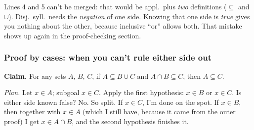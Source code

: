 \begin{center}
\end{center}

Lines 4 and 5 can't be merged: that would be appl.\ plus \emph{two} definitions ($\subseteq$ and $\cup$). Disj.\ syll.\ needs the \emph{negation} of one side. Knowing that one side is \emph{true} gives you nothing about the other, because inclusive ``or'' allows both. That mistake shows up again in the proof-checking section.

\subsubsection{Proof by cases: when you can't rule either side out}

\textbf{Claim.} For any sets $A$, $B$, $C$, if $A\subseteq B\cup C$ and $A\cap B\subseteq C$, then $A\subseteq C$.

\emph{Plan.} Let $x\in A$; subgoal $x\in C$. Apply the first hypothesis: $x\in B$ or $x\in C$. Is either side known false? No. So split. If $x\in C$, I'm done on the spot. If $x\in B$, then together with $x\in A$ (which I still have, because it came from the outer proof) I get $x\in A\cap B$, and the second hypothesis finishes it.

